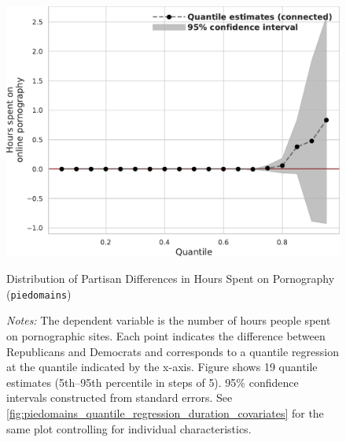 \documentclass[12pt,twoside]{article}
\begin{document}
\begin{figure}[ht]
	\centering
	\includegraphics[width=.6\linewidth]{figs/piedomains_quantile_reg_duration_adult.pdf}
	\caption{Distribution of Partisan Differences in Hours Spent on Pornography (\texttt{piedomains})}
	\caption*{\footnotesize \emph{Notes:} 
		The dependent variable is the number of hours people spent on pornographic sites. Each point indicates the difference between Republicans and Democrats and corresponds to a quantile regression at the quantile indicated by the x-axis. Figure shows 19 quantile estimates (5th--95th percentile in steps of 5). 95\% confidence intervals constructed from standard errors. See \cref{fig:piedomains_quantile_regression_duration_covariates} for the same plot controlling for individual characteristics.
	}
	\label{fig:piedomains_quantile_regression_duration}
\end{figure}
\end{document}
